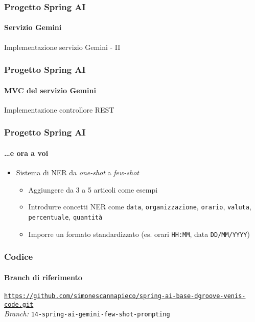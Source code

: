 %
\begin{frame}[t,fragile] \frametitle{Progetto Spring AI}
    \framesubtitle{Servizio Gemini}
        \vspace*{-.7cm}
        \begin{block}{Implementazione servizio Gemini - II}
            {\tiny}
    \end{block}
\end{frame}
%
\begin{frame}[t,fragile] \frametitle{Progetto Spring AI}
    \framesubtitle{MVC del servizio Gemini}
    	\vspace*{-.7cm}
        \begin{block}{Implementazione controllore REST}
			{\tiny}
    	\end{block}
\end{frame}
%
\begin{frame}[t,fragile] \frametitle{Progetto Spring AI}
    \framesubtitle{\ldots e ora a voi}
    {\small
        \begin{itemize}[leftmargin=10pt,align=right]
            \item[\alert{\faArrowCircleRight}] Sistema di NER da \alert{\textit{one-shot} a \textit{few-shot}}
            \begin{itemize}[leftmargin=10pt,align=right]
                \item[\alert{\faArrowCircleRight}] Aggiungere da 3 a 5 articoli come esempi
                \item[\alert{\faArrowCircleRight}] Introdurre concetti NER come \texttt{data}, \texttt{organizzazione}, \texttt{orario}, \texttt{valuta}, \texttt{percentuale}, \texttt{quantità} 
                \item[\alert{\faArrowCircleRight}] Imporre un formato standardizzato (es. orari \texttt{HH:MM}, data \texttt{DD/MM/YYYY})  
            \end{itemize}
        \end{itemize}
    }
\end{frame}
%
\begin{frame}[fragile] \frametitle{Codice}
    \framesubtitle{Branch di riferimento}
	\begin{center}
		{\scriptsize \href{https://github.com/simonescannapieco/spring-ai-base-dgroove-venis-code.git}{\texttt{https://github.com/simonescannapieco/spring-ai-base-dgroove-venis-code.git}}}\\
		\textit{Branch:} \alert{\texttt{14-spring-ai-gemini-few-shot-prompting}}
	\end{center}
\end{frame}